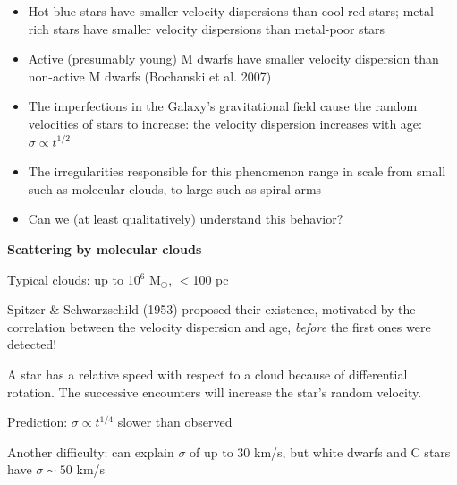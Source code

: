\documentclass[letterpaper,landscape]{slides}
\begin{document}
\begin{slide}
{\begin{minipage}[t]{16cm}
\begin{itemize}
\item Hot blue stars have smaller velocity dispersions than cool red stars;
metal-rich stars  have smaller velocity dispersions than metal-poor stars 
\item Active (presumably young) M dwarfs have smaller velocity dispersion
than non-active M dwarfs (Bochanski et al. 2007) 
\item
The imperfections in the Galaxy's gravitational field cause the random 
velocities of stars to increase: {\color{blue} the velocity dispersion increases with age:}
{\color{red} $\sigma \propto t^{1/2}$}
\item The irregularities responsible for this phenomenon range in scale 
from small such as {\color{blue} molecular clouds}, to large such as {\color{blue} 
spiral arms}
\item
Can we (at least qualitatively) understand this behavior?
\end{itemize}     

\end{minipage}}

\vfill 
\end{slide}





\begin{slide}

{\color{blue} \bf Scattering by molecular clouds} 

Typical clouds: up to 10$^6$ M$_\odot$, $<$100 pc

Spitzer \& Schwarzschild (1953) proposed their existence,
motivated by the correlation between the velocity dispersion
and age, {\it before} the first ones were detected!

A star has a relative speed with respect to a cloud because of
differential rotation. The successive encounters will 
increase the star's random velocity.

{\color{blue} Prediction: $\sigma \propto t^{1/4}$} 
{\color{red} slower than observed}

Another difficulty: can explain $\sigma$ of up to 30 km/s,
but white dwarfs and C stars have $\sigma \sim 50$ km/s



\vfill
\end{slide}
\end{document}

